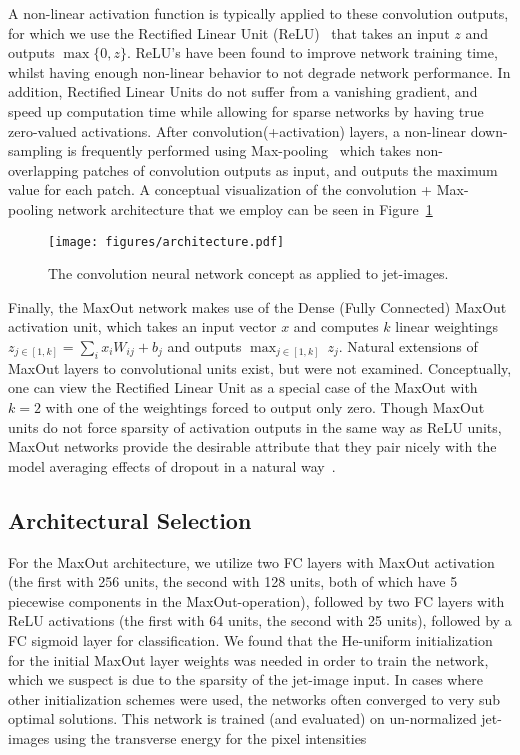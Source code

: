 A non-linear activation function is typically applied to these convolution outputs, for which we use the Rectified Linear Unit (ReLU)~\cite{RELU} that takes an input $z$ and outputs $\max\{0,z\}$. ReLU's have been found to improve network training time, whilst having enough non-linear behavior to not degrade network performance. In addition, Rectified Linear Units do not suffer from a vanishing gradient, and speed up computation time while allowing for sparse networks by having true zero-valued activations.  After convolution(+activation) layers, a non-linear down-sampling is frequently performed using Max-pooling~\cite{MAXPOOL} which takes non-overlapping patches of convolution outputs as input, and outputs the maximum value for each patch.  A conceptual visualization of the convolution + Max-pooling network architecture that we employ can be seen in Figure~\ref{fig:arch}
\begin{figure}[!htbp]
  \centering
  \texttt{[image: figures/architecture.pdf]}
  \caption{The convolution neural network concept as applied to jet-images.}
  \label{fig:arch}
\end{figure}

Finally, the MaxOut network makes use of the Dense (Fully Connected) MaxOut activation unit, which takes an input vector $x$ and computes $k$ linear weightings $z_{j\in [1,k]} = \sum_{i} x_{i} W_{ij} + b_{j}$ and  outputs $\max_{j\in [1,k]}\ z_{j}$. Natural extensions of MaxOut layers to convolutional units exist, but were not examined. Conceptually, one can view the Rectified Linear Unit as a special case of the MaxOut with $k=2$ with one of the weightings forced to output only zero. Though MaxOut units do not force sparsity of activation outputs in the same way as ReLU units, MaxOut networks provide the desirable attribute that they pair nicely with the model averaging effects of dropout in a natural way~\cite{maxout:goodfellow}. 




\subsection{Architectural Selection} %
\label{ssub:architectural_selection}
For the MaxOut architecture, we utilize two FC layers with MaxOut activation (the first with 256 units, the second with 128 units, both of which have 5 piecewise components in the MaxOut-operation), followed by two FC layers with ReLU activations (the first with 64 units, the second with 25 units), followed by a FC sigmoid layer for classification. We found that the He-uniform initialization~\cite{HE_initialization} for the initial MaxOut layer weights was needed in order to train the network, which we suspect is due to the sparsity of the jet-image input. In cases where other initialization schemes were used, the networks often converged to very sub optimal solutions.  This network is trained (and evaluated) on un-normalized jet-images using the transverse energy for the pixel intensities

